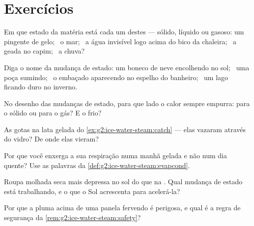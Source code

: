 \section{Exercícios}

\begin{exercise}[$\star$]\label{exo:g2:ice-water-steam:1}
Em que estado da matéria está cada um destes --- sólido, líquido ou
gasoso: um pingente de gelo; \ o mar; \ a água invisível logo acima
do bico da chaleira; \ a geada no capim; \ a chuva?
\end{exercise}

\begin{exercise}[$\star$]\label{exo:g2:ice-water-steam:2}
Diga o nome da mudança de estado: um boneco de neve encolhendo no
sol; \ uma poça sumindo; \ o embaçado aparecendo no espelho do
banheiro; \ um lago ficando duro no inverno.
\end{exercise}

\begin{exercise}[$\star$]\label{exo:g2:ice-water-steam:3}
No desenho das mudanças de estado, para que lado o calor sempre
empurra: para o sólido ou para o gás? E o frio?
\end{exercise}

\begin{exercise}[$\star$]\label{exo:g2:ice-water-steam:4}
As gotas na lata gelada do \cref{ex:g2:ice-water-steam:catch} ---
elas vazaram através do vidro? De onde elas vieram?
\end{exercise}

\begin{exercise}[$\star$]\label{exo:g2:ice-water-steam:5}
Por que você enxerga a sua respiração numa manhã gelada e não num dia
quente? Use as palavras da \cref{def:g2:ice-water-steam:evapcond}.
\end{exercise}

\begin{exercise}[$\star$]\label{exo:g2:ice-water-steam:6}
Roupa molhada seca mais depressa no sol do que na . Qual
mudança de estado está trabalhando, e o que o Sol acrescenta para
acelerá-la?
\end{exercise}

\begin{exercise}[$\star$]\label{exo:g2:ice-water-steam:7}
Por que a pluma acima de uma panela fervendo é perigosa, e qual é a
regra de segurança da \cref{rem:g2:ice-water-steam:safety}?
\end{exercise}

